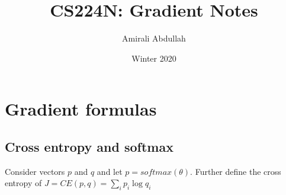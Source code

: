 \documentclass{article}
\title{CS224N: Gradient Notes}
\author{Amirali Abdullah}
\date{Winter 2020}
\begin{document}
\section{Gradient formulas}

\subsection{Cross entropy and softmax}
Consider vectors $p$ and $q$ and let $p = softmax(\theta)$.
Further define the cross entropy of $J = CE(p,q) = \sum_i p_i \log q_i$
\end{document}
